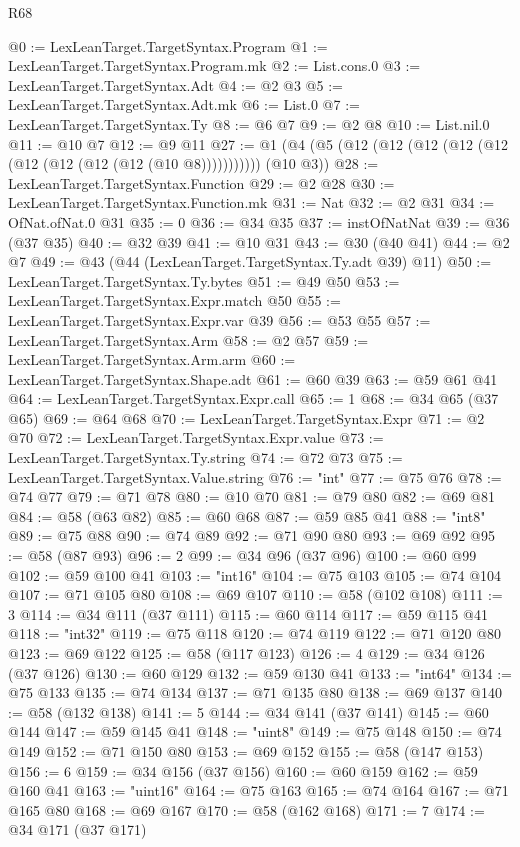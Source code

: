 \begin{lexlean}{R68}
\begin{coremodule}
@0 := LexLeanTarget.TargetSyntax.Program
@1 := LexLeanTarget.TargetSyntax.Program.mk
@2 := List.cons.{0}
@3 := LexLeanTarget.TargetSyntax.Adt
@4 := @2 @3
@5 := LexLeanTarget.TargetSyntax.Adt.mk
@6 := List.{0}
@7 := LexLeanTarget.TargetSyntax.Ty
@8 := @6 @7
@9 := @2 @8
@10 := List.nil.{0}
@11 := @10 @7
@12 := @9 @11
@27 := @1 (@4 (@5 (@12 (@12 (@12 (@12 (@12 (@12 (@12 (@12 (@12 (@10 @8))))))))))) (@10 @3))
@28 := LexLeanTarget.TargetSyntax.Function
@29 := @2 @28
@30 := LexLeanTarget.TargetSyntax.Function.mk
@31 := Nat
@32 := @2 @31
@34 := OfNat.ofNat.{0} @31
@35 := 0
@36 := @34 @35
@37 := instOfNatNat
@39 := @36 (@37 @35)
@40 := @32 @39
@41 := @10 @31
@43 := @30 (@40 @41)
@44 := @2 @7
@49 := @43 (@44 (LexLeanTarget.TargetSyntax.Ty.adt @39) @11)
@50 := LexLeanTarget.TargetSyntax.Ty.bytes
@51 := @49 @50
@53 := LexLeanTarget.TargetSyntax.Expr.match @50
@55 := LexLeanTarget.TargetSyntax.Expr.var @39
@56 := @53 @55
@57 := LexLeanTarget.TargetSyntax.Arm
@58 := @2 @57
@59 := LexLeanTarget.TargetSyntax.Arm.arm
@60 := LexLeanTarget.TargetSyntax.Shape.adt
@61 := @60 @39
@63 := @59 @61 @41
@64 := LexLeanTarget.TargetSyntax.Expr.call
@65 := 1
@68 := @34 @65 (@37 @65)
@69 := @64 @68
@70 := LexLeanTarget.TargetSyntax.Expr
@71 := @2 @70
@72 := LexLeanTarget.TargetSyntax.Expr.value
@73 := LexLeanTarget.TargetSyntax.Ty.string
@74 := @72 @73
@75 := LexLeanTarget.TargetSyntax.Value.string
@76 := "int"
@77 := @75 @76
@78 := @74 @77
@79 := @71 @78
@80 := @10 @70
@81 := @79 @80
@82 := @69 @81
@84 := @58 (@63 @82)
@85 := @60 @68
@87 := @59 @85 @41
@88 := "int8"
@89 := @75 @88
@90 := @74 @89
@92 := @71 @90 @80
@93 := @69 @92
@95 := @58 (@87 @93)
@96 := 2
@99 := @34 @96 (@37 @96)
@100 := @60 @99
@102 := @59 @100 @41
@103 := "int16"
@104 := @75 @103
@105 := @74 @104
@107 := @71 @105 @80
@108 := @69 @107
@110 := @58 (@102 @108)
@111 := 3
@114 := @34 @111 (@37 @111)
@115 := @60 @114
@117 := @59 @115 @41
@118 := "int32"
@119 := @75 @118
@120 := @74 @119
@122 := @71 @120 @80
@123 := @69 @122
@125 := @58 (@117 @123)
@126 := 4
@129 := @34 @126 (@37 @126)
@130 := @60 @129
@132 := @59 @130 @41
@133 := "int64"
@134 := @75 @133
@135 := @74 @134
@137 := @71 @135 @80
@138 := @69 @137
@140 := @58 (@132 @138)
@141 := 5
@144 := @34 @141 (@37 @141)
@145 := @60 @144
@147 := @59 @145 @41
@148 := "uint8"
@149 := @75 @148
@150 := @74 @149
@152 := @71 @150 @80
@153 := @69 @152
@155 := @58 (@147 @153)
@156 := 6
@159 := @34 @156 (@37 @156)
@160 := @60 @159
@162 := @59 @160 @41
@163 := "uint16"
@164 := @75 @163
@165 := @74 @164
@167 := @71 @165 @80
@168 := @69 @167
@170 := @58 (@162 @168)
@171 := 7
@174 := @34 @171 (@37 @171)

\end{coremodule}
\end{lexlean}

